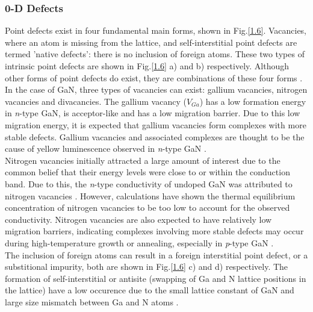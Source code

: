 \subsubsection{0-D Defects}
\label{Point defect section}
Point defects exist in four fundamental main forms, shown in Fig.\ref{1.6}.  Vacancies, where an atom is missing from the lattice, and self-interstitial point defects are termed 'native defects': there is no inclusion of foreign atoms. These two types of intrinsic point defects are shown in Fig.\ref{1.6} a) and b) respectively. Although other forms of point defects do exist, they are combinations of these four forms \cite{Reshchikov2005}.\\ 
In the case of GaN, three types of vacancies can exist: gallium vacancies, nitrogen vacancies and divacancies. The gallium vacancy ($V_{Ga}$) has a low formation energy in {\it n}-type GaN, is acceptor-like and has a low migration barrier. Due to this low migration energy, it is expected that gallium vacancies form complexes with more stable defects. Gallium vacancies and associated complexes are thought to be the cause of yellow luminescence observed in {\it n}-type GaN \cite{Bennett2010b}.\\
Nitrogen vacancies initially attracted a large amount of interest due to the common belief that their energy levels were close to or within the conduction band. Due to this, the {\it n}-type conductivity of undoped GaN was attributed to nitrogen vacancies \cite{StriteS.Morkoc1992}.  However, calculations have shown the thermal equilibrium concentration of nitrogen vacancies to be too low to account for the observed conductivity. Nitrogen vacancies are also expected to have relatively low migration barriers, indicating complexes involving more stable defects may occur during high-temperature growth or annealing, especially in {\it p}-type GaN \cite{Reshchikov2005}.
\\The inclusion of foreign atoms can result in a foreign interstitial point defect, or a substitional impurity, both are shown in Fig.\ref{1.6} c) and d) respectively. The formation of self-interstitial or antisite (swapping of Ga and N lattice positions in the lattice) have a low occurence due to the small lattice constant of GaN and large size mismatch between Ga and N atoms \cite{Reshchikov2005}.
